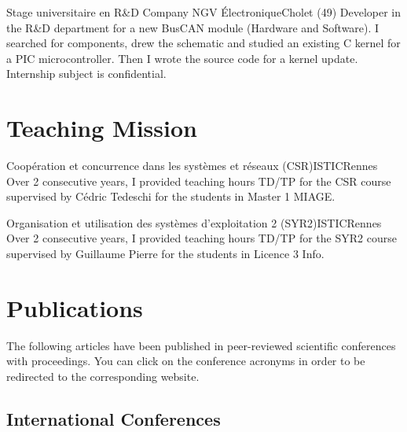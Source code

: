 \documentclass[11pt,a4paper]{moderncv}
\begin{document}
  {Stage universitaire en R\&D}
  {Company NGV Électronique}{Cholet (49)}{}
  {Developer in the R\&D department for a new BusCAN module (Hardware and Software). I searched for components, drew the schematic and studied an existing C kernel for a PIC microcontroller. Then I wrote the source code for a kernel update. Internship subject is confidential.}
\vspace{1.2em}

\section{Teaching Mission}

  {Coopération et concurrence dans les systèmes et réseaux (CSR)}{ISTIC}{Rennes}{}
  {Over 2 consecutive years, I provided teaching hours TD/TP for the CSR course supervised by Cédric Tedeschi for the students in Master 1 MIAGE.}
\vspace{0.6em}

  {Organisation et utilisation des systèmes d'exploitation 2 (SYR2)}{ISTIC}{Rennes}{}
  {Over 2 consecutive years, I provided teaching hours TD/TP for the SYR2 course supervised by Guillaume Pierre for the students in Licence 3 Info.}

\newpage
\section{Publications}

The following articles have been published in peer-reviewed scientific conferences with proceedings. You can click on the conference acronyms in order to be redirected to the corresponding website. 

\subsection{International Conferences}

\vspace{0.6em}
\end{document}
